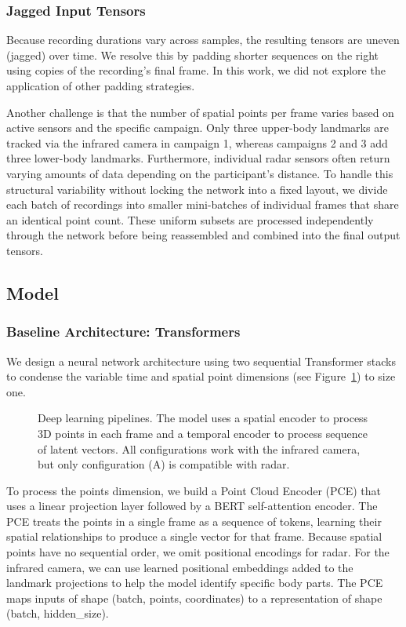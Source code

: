 \documentclass{article}
\begin{document}
\subsubsection{Jagged Input Tensors}

Because recording durations vary across samples, the resulting tensors are uneven (jagged) over time. We resolve this by padding shorter sequences on the right using copies of the recording's final frame. In this work, we did not explore the application of other padding strategies.

Another challenge is that the number of spatial points per frame varies based on active sensors and the specific campaign. Only three upper-body landmarks are tracked via the infrared camera in campaign 1, whereas campaigns 2 and 3 add three lower-body landmarks. Furthermore, individual radar sensors often return varying amounts of data depending on the participant's distance. To handle this structural variability without locking the network into a fixed layout, we divide each batch of recordings into smaller mini-batches of individual frames that share an identical point count. These uniform subsets are processed independently through the network before being reassembled and combined into the final output tensors.

\subsection{Model}

\subsubsection{Baseline Architecture: Transformers}

We design a neural network architecture using two sequential Transformer stacks to condense the variable time and spatial point dimensions (see Figure~\ref{fig:model_architecture}) to size one.

\begin{figure}[!t]
    \centering
    
    \caption{Deep learning pipelines. The model uses a spatial encoder to process 3D points in each frame and a temporal encoder to process sequence of latent vectors. All configurations work with the infrared camera, but only configuration (A) is compatible with radar.}
    \label{fig:model_architecture}
\end{figure}

To process the points dimension, we build a Point Cloud Encoder (PCE) that uses a linear projection layer followed by a BERT \cite{devlin2019bert} self-attention encoder. The PCE treats the points in a single frame as a sequence of tokens, learning their spatial relationships to produce a single vector for that frame. Because spatial points have no sequential order, we omit positional encodings for radar. For the infrared camera, we can use learned positional embeddings added to the landmark projections to help the model identify specific body parts. The PCE maps inputs of shape (batch, points, coordinates) to a representation of shape (batch, hidden\_size).
\end{document}
